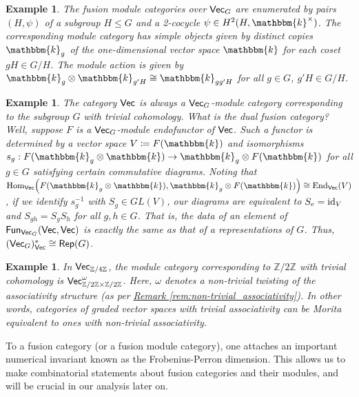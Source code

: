\documentclass[12pt, reqno]{amsart}
\numberwithin{equation}{section}
\theoremstyle{plainspace}
\theoremstyle{definitionspace}
\newtheorem{example}[theorem]{Example}
\theoremstyle{remarkspace}
\newcommand{\id}{\textup{id}}
\newcommand{\Hom}[2][]{
	\ifthenelse{\equal{#2}{}}
		{\textup{Hom}_{#1}}
		{\textup{Hom}_{#1}\!\left(#2\right)}
}
\newcommand{\End}[2][]{
	\ifthenelse{\equal{#2}{}}
		{\textup{End}_{#1}}
		{\textup{End}_{#1}\!\left(#2\right)}
}
\newcommand{\Fun}[2][]{
	\ifthenelse{\equal{#2}{}}
		{\textcat{Fun}_{#1}}
		{\textcat{Fun}_{#1}\!\left(#2\right)}
}
\newcommand{\textcat}[1]{\textup{\textsf{#1}}}
\begin{document}
\begin{example}\label{ex:module_category_graded_vect}
The fusion module categories over $\textcat{Vec}_G$ are enumerated by pairs $(H, \psi)$ of a subgroup $H \leq G$ and a 2-cocycle $\psi \in H^2(H, \mathbbm{k}^{\times})$. The corresponding module category has simple objects given by distinct copies $\mathbbm{k}_g$ of the one-dimensional vector space $\mathbbm{k}$ for each coset $gH \in G/H$. The module action is given by $\mathbbm{k}_g \otimes \mathbbm{k}_{g'H} \cong \mathbbm{k}_{gg'H}$ for all $g \in G$, $g'H \in G/H$.
\end{example}
\leavevmode

\begin{example}\label{ex:module_category_graded_vect_rep}
The category $\textcat{Vec}$ is always a $\textcat{Vec}_G$-module category corresponding to the subgroup $G$ with trivial cohomology. What is the dual fusion category? Well, suppose $F$ is a $\textcat{Vec}_G$-module endofunctor of $\textcat{Vec}$. Such a functor is determined by a vector space $V \coloneqq F(\mathbbm{k})$ and isomorphisms $s_g : F(\mathbbm{k}_g \otimes \mathbbm{k}) \to \mathbbm{k}_g \otimes F(\mathbbm{k})$ for all $g \in G$ satisfying certain commutative diagrams. Noting that $\Hom[\textcat{Vec}]{F(\mathbbm{k}_g \otimes \mathbbm{k}), \mathbbm{k}_g \otimes F(\mathbbm{k})} \cong \End[\textcat{Vec}]{V}$, if we identify $s_g^{-1}$ with $S_g \in GL(V)$, our diagrams are equivalent to $S_e = \id_V$ and $S_{gh} = S_g S_h$ for all $g, h \in G$. That is, the data of an element of $\Fun[\textcat{Vec}_G]{\textcat{Vec}, \textcat{Vec}}$ is exactly the same as that of a representations of $G$. Thus, $(\textcat{Vec}_G)_{\textcat{Vec}}^{*} \cong \textcat{Rep}(G)$.
\end{example}
\leavevmode

\begin{example}\label{ex:module_category_Z4}
In $\textcat{Vec}_{\mathbb{Z}/4\mathbb{Z}}$, the module category corresponding to $\mathbb{Z}/2\mathbb{Z}$ with trivial cohomology is $\textcat{Vec}_{\mathbb{Z}/2\mathbb{Z} \times \mathbb{Z}/2\mathbb{Z}}^{\omega}$. Here, $\omega$ denotes a non-trivial twisting of the associativity structure (as per \hyperref[rem:non-trivial_associativity]{Remark \ref*{rem:non-trivial_associativity}}). In other words, categories of graded vector spaces with trivial associativity can be Morita equivalent to ones with non-trivial associativity.
\end{example}
\leavevmode

\noindent To a fusion category (or a fusion module category), one attaches an important numerical invariant known as the Frobenius-Perron dimension. This allows us to make combinatorial statements about fusion categories and their modules, and will be crucial in our analysis later on.
\newline
\end{document}
